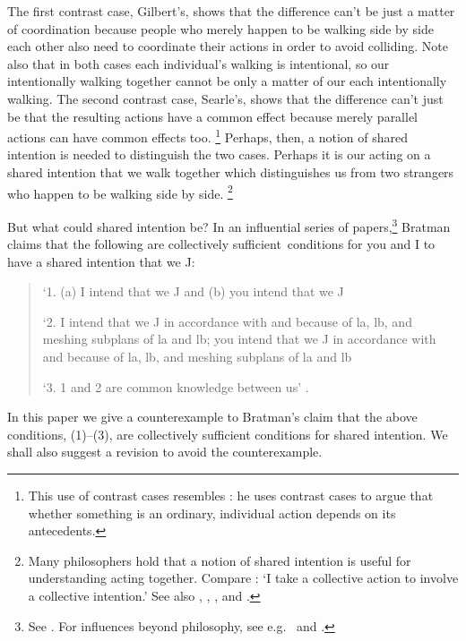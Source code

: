 \documentclass[12pt,\papersize]{extarticle}
\begin{document}
The first contrast case, Gilbert's, shows that the difference can’t be just  a matter of coordination because people who merely happen to be walking side by side each other also need to coordinate their actions in order to avoid colliding.  
Note also that in both cases each individual's walking is intentional, so our intentionally walking together cannot be  only a matter of our each intentionally walking.
The second contrast case, Searle's, shows that the difference can’t just be that the resulting actions have a common effect because merely parallel actions can have common effects too.%
\footnote{
This use of contrast cases resembles \citet{Pears:1971fk}: he uses contrast cases to argue that whether something is an ordinary, individual action depends on its antecedents. 
} 
Perhaps, then, a notion of shared intention is needed to distinguish the two cases.  
Perhaps it is our acting on a shared intention that we walk together which distinguishes us from two strangers who happen to be walking side by side.%
\footnote{
Many philosophers hold that a notion of shared intention is useful for understanding acting together. 
Compare \citet[p.\ 5]{Gilbert:2006wr}: `I take a collective action to involve a collective intention.'  See also  
	\citet[p.\ 381]{Carpenter:2009wq}, 
	\citet[p.\ 369]{Call:2009fk}, 
	\citet{Kutz:2000si}, 
	\citet[p.\ 117]{rakoczy_pretend_2006} and 
	\citet{Tollefsen:2005vh}.
	}
	

But what could shared intention be?
In an influential series of papers,\footnote{ 
See \citet{Bratman:1992mi,Bratman:1993je,Bratman:1999fr,Bratman:2009lv}.
For influences beyond philosophy, see e.g.\ \citet{Tomasello:2005wx} and \citet{Knoblich:2008hy}. 
}
Bratman claims that the following are collectively sufficient\footnotemark \ conditions for you and I to have a shared intention that we J:
%
%
\begin{quote}
\label{quote:bratman_account}
`1. (a) I intend that we J and (b) you intend that we J
 
`2. I intend that we J in accordance with and because of la, lb, and meshing subplans of la and lb; you intend that we J in accordance with and because of la, lb, and meshing subplans of la and lb
 
`3. 1 and 2 are common knowledge between us' \citep[][p.\ View 4]{Bratman:1993je}.
\end{quote}
%
In this paper we give a counterexample to Bratman's  claim that the above conditions, (1)--(3), are collectively sufficient conditions for shared intention. 
We shall also suggest a revision to avoid the counterexample.
\end{document}
